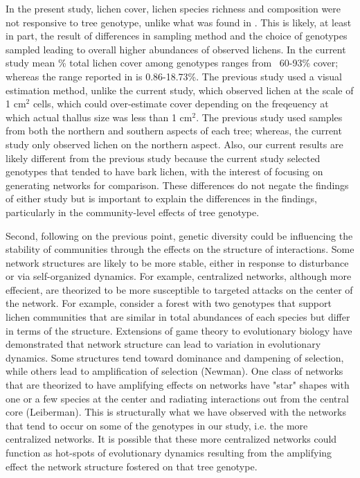 \documentclass[11pt,twocolumn,twoside,lineno]{pnas-new}
\begin{document}
In the present study, lichen cover, lichen species richness and
composition were not responsive to tree genotype, unlike what was
found in \citep{Lamit2015a}. This is likely, at least in part, the
result of differences in sampling method and the choice of genotypes
sampled leading to overall higher abundances of observed lichens. In
the current study mean \% total lichen cover among genotypes ranges
from ~60-93\% cover; whereas the range reported in \citep{Lamit2015a}
is 0.86-18.73\%.  The previous study used a visual estimation method,
unlike the current study, which observed lichen at the scale of 1
cm$^2$ cells, which could over-estimate cover depending on the
freqeuency at which actual thallus size was less than 1 cm$^2$.  The
previous study used samples from both the northern and southern
aspects of each tree; whereas, the current study only observed lichen
on the northern aspect.  Also, our current results are likely
different from the previous study because the current study selected
genotypes that tended to have bark lichen, with the interest of
focusing on generating networks for comparison. These differences do
not negate the findings of either study but is important to explain
the differences in the findings, particularly in the community-level
effects of tree genotype.

Second, following on the previous point, genetic diversity could be
influencing the stability of communities through the effects on the
structure of interactions. Some network structures are likely to be
more stable, either in response to disturbance or via self-organized
dynamics. For example, centralized networks, although more effecient,
are theorized to be more susceptible to targeted attacks on the center
of the network. For example, consider a forest with two genotypes that
support lichen communities that are similar in total abundances of
each species but differ in terms of the structure. Extensions of game
theory to evolutionary biology have demonstrated that network
structure can lead to variation in evolutionary dynamics. Some
structures tend toward dominance and dampening of selection, while
others lead to amplification of selection (Newman). One class of
networks that are theorized to have amplifying effects on networks
have "star" shapes with one or a few species at the center and
radiating interactions out from the central core (Leiberman). This is
structurally what we have observed with the networks that tend to
occur on some of the genotypes in our study, i.e. the more centralized
networks. It is possible that these more centralized networks could
function as hot-spots of evolutionary dynamics resulting from the
amplifying effect the network structure fostered on that tree
genotype.
\end{document}
